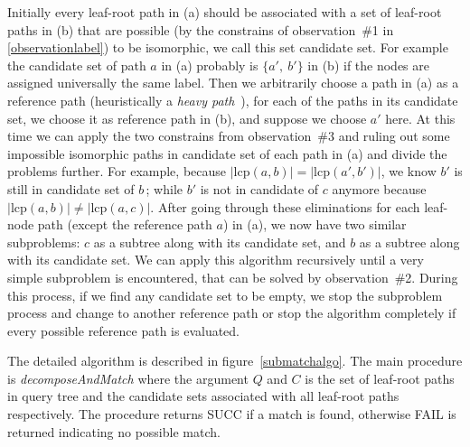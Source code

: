 Initially every leaf-root path in (a) should be associated with a set of leaf-root paths in (b) that are possible (by the constrains of observation~\#1 in \ref{observationlabel}) to be isomorphic, we call this set candidate set. For example the candidate set of path $a$ in (a) probably is $\{a',\ b'\}$ in (b) if the nodes are assigned universally the same label. 
Then we arbitrarily choose a path in (a) as a reference path (heuristically a \textit{heavy path}~\cite{heavypathde}), for each of the paths in its candidate set, we choose it as reference path in (b), and suppose we choose $a'$ here. At this time we can apply the two constrains from observation~\#3 and ruling out some impossible isomorphic paths in candidate set of each path in (a) and divide the problems further. 
For example, because $\left| \mathrm{lcp}(a,b) \right| = \left| \mathrm{lcp}(a',b') \right|$, we know $b'$ is still in candidate set of $b\,$; while $b'$ is not in candidate of $c$ anymore because $\left| \mathrm{lcp}(a,b) \right| \neq \left| \mathrm{lcp}(a,c) \right|$. 
After going through these eliminations for each leaf-node path (except the reference path $a$) in (a), we now have two similar subproblems: $c$ as a subtree along with its candidate set, and $b$ as a subtree along with its candidate set. 
We can apply this algorithm recursively until a very simple subproblem is encountered, that can be solved by observation~\#2. During this process, if we find any candidate set to be empty, we stop the subproblem process and change to another reference path or stop the algorithm completely if every possible reference path is evaluated.

The detailed algorithm is described in figure~\ref{submatchalgo}. 
The main procedure is \textit{decomposeAndMatch} where the argument $Q$ and $C$ is the set of leaf-root paths in query tree and the candidate sets associated with all leaf-root paths respectively.
The procedure returns SUCC if a match is found, otherwise FAIL is returned indicating no possible match.


